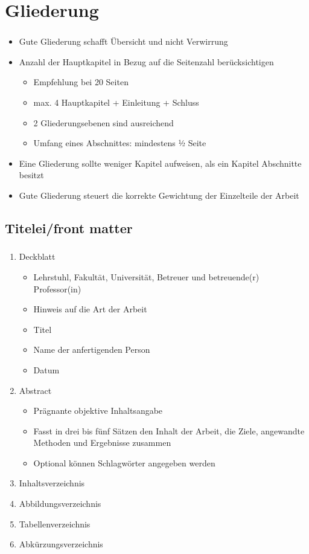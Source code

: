 \documentclass[aspectratio=169]{beamer}
\begin{document}
\section{Gliederung}
\begin{frame}
  \frametitle{\insertsection}%
  \framesubtitle{\insertsubsection}%
  \begin{itemize}
   \item Gute Gliederung schafft Übersicht und nicht Verwirrung
   \item Anzahl der Hauptkapitel in Bezug auf die Seitenzahl berücksichtigen
   \begin{itemize}
    \item Empfehlung bei 20 Seiten
    \item max. 4 Hauptkapitel + Einleitung + Schluss
    \item 2 Gliederungsebenen sind ausreichend
    \item Umfang eines Abschnittes: mindestens ½ Seite
   \end{itemize}
   \item Eine Gliederung sollte weniger Kapitel aufweisen, als ein Kapitel Abschnitte besitzt
   \item Gute Gliederung steuert die korrekte Gewichtung der Einzelteile der Arbeit
  \end{itemize}
\end{frame}

\subsection{Titelei/front matter}
\begin{frame}
  \frametitle{\insertsection}%
  \framesubtitle{\insertsubsection}%
  \begin{enumerate}
   \item Deckblatt
   \begin{itemize}
    \item Lehrstuhl, Fakultät, Universität, Betreuer und betreuende(r) Professor(in)
    \item Hinweis auf die Art der Arbeit
    \item Titel
    \item Name der anfertigenden Person
    \item Datum
   \end{itemize}
   \item Abstract
   \begin{itemize}
    \item Prägnante objektive Inhaltsangabe
    \item Fasst in drei bis fünf Sätzen den Inhalt der Arbeit, die Ziele, angewandte Methoden und Ergebnisse zusammen
    \item Optional können Schlagwörter angegeben werden
   \end{itemize}
   \item Inhaltsverzeichnis
   \item Abbildungsverzeichnis
   \item Tabellenverzeichnis
   \item Abkürzungsverzeichnis
  \end{enumerate}
\end{frame}
\end{document}
